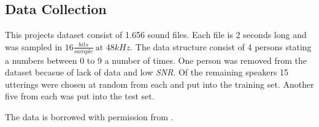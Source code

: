 \subsection*{Data Collection}

This projects dataset consist of 1.656 sound files. 
Each file is 2 seconds long and was sampled in $16 \frac{bits}{sample} \ \text{at } 48 kHz $.
The data structure consist of 4 persons stating a numbers between 0 to 9 a number of times. 
One person was removed from the dataset becasue of lack of data and low \emph{SNR}.
Of the remaining speakers 15 utterings were chosen at random from each and put into the training set.
Another five from each was put into the test set.

The data is borrowed with permission from \cite{DataSet}. 